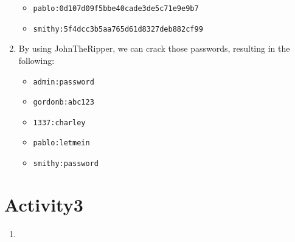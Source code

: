 \begin{enumerate}
\begin{itemize}
        \item \texttt{pablo:0d107d09f5bbe40cade3de5c71e9e9b7}
        \item \texttt{smithy:5f4dcc3b5aa765d61d8327deb882cf99}
    \end{itemize}
    \item By using JohnTheRipper, we can crack those passwords, resulting in the following:
    \begin{itemize}
        \item \texttt{admin:password}
        \item \texttt{gordonb:abc123}
        \item \texttt{1337:charley}
        \item \texttt{pablo:letmein}
        \item \texttt{smithy:password}
    \end{itemize}
\end{enumerate}



\section*{Activity3}

\begin{enumerate}
    \item 
\end{enumerate}